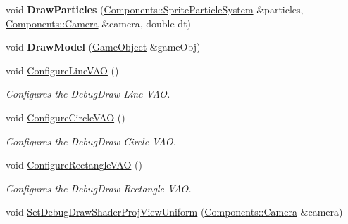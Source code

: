 \begin{DoxyCompactItemize}
\item 
\hypertarget{classDCEngine_1_1Systems_1_1GraphicsGL_ab388e3a4dbcc67dc3d1bfd9935f4971c}{void {\bfseries Draw\-Particles} (\hyperlink{classDCEngine_1_1Components_1_1SpriteParticleSystem}{Components\-::\-Sprite\-Particle\-System} \&particles, \hyperlink{classDCEngine_1_1Components_1_1Camera}{Components\-::\-Camera} \&camera, double dt)}\label{classDCEngine_1_1Systems_1_1GraphicsGL_ab388e3a4dbcc67dc3d1bfd9935f4971c}

\item 
\hypertarget{classDCEngine_1_1Systems_1_1GraphicsGL_aaa6db66af536b63b3090f32340f3f07f}{void {\bfseries Draw\-Model} (\hyperlink{classDCEngine_1_1GameObject}{Game\-Object} \&game\-Obj)}\label{classDCEngine_1_1Systems_1_1GraphicsGL_aaa6db66af536b63b3090f32340f3f07f}

\item 
\hypertarget{classDCEngine_1_1Systems_1_1GraphicsGL_af12047cd30c853b0e157d4e3694827a1}{void \hyperlink{classDCEngine_1_1Systems_1_1GraphicsGL_af12047cd30c853b0e157d4e3694827a1}{Configure\-Line\-V\-A\-O} ()}\label{classDCEngine_1_1Systems_1_1GraphicsGL_af12047cd30c853b0e157d4e3694827a1}

\begin{DoxyCompactList}\small\item\em Configures the Debug\-Draw Line V\-A\-O. \end{DoxyCompactList}\item 
\hypertarget{classDCEngine_1_1Systems_1_1GraphicsGL_a525ab06577dfcd88cc4fd1b598d217d5}{void \hyperlink{classDCEngine_1_1Systems_1_1GraphicsGL_a525ab06577dfcd88cc4fd1b598d217d5}{Configure\-Circle\-V\-A\-O} ()}\label{classDCEngine_1_1Systems_1_1GraphicsGL_a525ab06577dfcd88cc4fd1b598d217d5}

\begin{DoxyCompactList}\small\item\em Configures the Debug\-Draw Circle V\-A\-O. \end{DoxyCompactList}\item 
\hypertarget{classDCEngine_1_1Systems_1_1GraphicsGL_a10131138d8272527603e970c44909999}{void \hyperlink{classDCEngine_1_1Systems_1_1GraphicsGL_a10131138d8272527603e970c44909999}{Configure\-Rectangle\-V\-A\-O} ()}\label{classDCEngine_1_1Systems_1_1GraphicsGL_a10131138d8272527603e970c44909999}

\begin{DoxyCompactList}\small\item\em Configures the Debug\-Draw Rectangle V\-A\-O. \end{DoxyCompactList}\item 
\hypertarget{classDCEngine_1_1Systems_1_1GraphicsGL_a20653843925b2566b0d74f22c36e552f}{void \hyperlink{classDCEngine_1_1Systems_1_1GraphicsGL_a20653843925b2566b0d74f22c36e552f}{Set\-Debug\-Draw\-Shader\-Proj\-View\-Uniform} (\hyperlink{classDCEngine_1_1Components_1_1Camera}{Components\-::\-Camera} \&camera)}\label{classDCEngine_1_1Systems_1_1GraphicsGL_a20653843925b2566b0d74f22c36e552f}


\end{DoxyCompactItemize}
